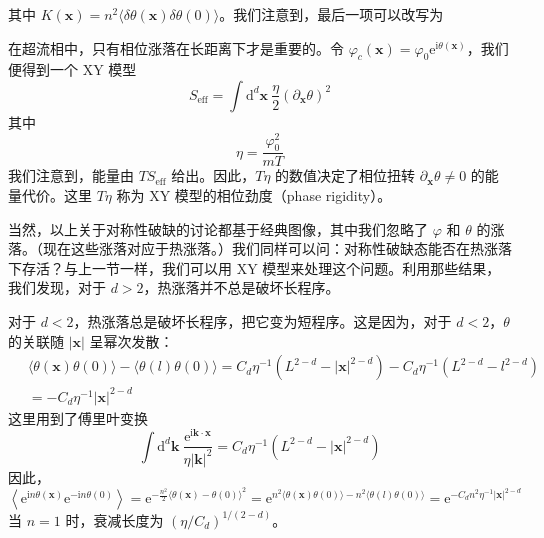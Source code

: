 其中 $K(\pmb{x}) = n^{2}\langle \delta\theta(\pmb{x})\delta\theta(0)\rangle$。我们注意到，最后一项可以改写为

在超流相中，只有相位涨落在长距离下才是重要的。令 $\varphi_c(\pmb{x}) = \varphi_0\mathrm{e}^{\mathrm{i}\theta(\pmb{x})}$，我们便得到一个 XY 模型
\begin{equation*}
S_{\mathrm{eff}} = \int \mathrm{d}^{d}\pmb{x}\ \frac{\eta}{2}(\partial_{\pmb{x}}\theta)^{2}
\tag{3.4.2}
\end{equation*}
其中
\begin{equation*}
\eta = \frac{\varphi_{0}^{2}}{mT}
\tag{3.4.3}
\end{equation*}
我们注意到，能量由 $TS_{\mathrm{eff}}$ 给出。因此，$T\eta$ 的数值决定了相位扭转 $\partial_{\pmb{x}}\theta \neq 0$ 的能量代价。这里 $T\eta$ 称为 XY 模型的相位劲度（phase rigidity）。

当然，以上关于对称性破缺的讨论都基于经典图像，其中我们忽略了 $\varphi$ 和 $\theta$ 的涨落。（现在这些涨落对应于热涨落。）我们同样可以问：对称性破缺态能否在热涨落下存活？与上一节一样，我们可以用 XY 模型来处理这个问题。利用那些结果，我们发现，对于 $d>2$，热涨落并不总是破坏长程序。

对于 $d<2$，热涨落总是破坏长程序，把它变为短程序。这是因为，对于 $d<2$，$\theta$ 的关联随 $|\pmb{x}|$ 呈幂次发散：
\begin{equation*}
\begin{aligned}
&\ \langle \theta(\pmb{x})\theta(0)\rangle - \langle \theta(l)\theta(0)\rangle
 = C_{d}\eta^{-1}(L^{2-d} - |\pmb{x}|^{2-d}) - C_{d}\eta^{-1}(L^{2-d} - l^{2-d}) \\
&\ = -C_{d}\eta^{-1}|\pmb{x}|^{2-d}
\end{aligned}
\end{equation*}
这里用到了傅里叶变换
\begin{equation*}
\int \mathrm{d}^{d}\pmb{k}\ \frac{\mathrm{e}^{\mathrm{i}\pmb{k}\cdot\pmb{x}}}{\eta|\pmb{k}|^{2}} = C_{d}\eta^{-1}(L^{2-d} - |\pmb{x}|^{2-d})
\end{equation*}
因此，
\begin{equation*}
\left\langle \mathrm{e}^{\mathrm{i}n\theta(\pmb{x})}\mathrm{e}^{-\mathrm{i}n\theta(0)} \right\rangle
= \mathrm{e}^{-\frac{n^{2}}{2}\langle \theta(\pmb{x})-\theta(0)\rangle^{2}}
= \mathrm{e}^{n^{2}\langle \theta(\pmb{x})\theta(0)\rangle - n^{2}\langle \theta(l)\theta(0)\rangle}
= \mathrm{e}^{-C_{d}n^{2}\eta^{-1}|\pmb{x}|^{2-d}}
\end{equation*}
当 $n=1$ 时，衰减长度为 $(\eta/C_{d})^{1/(2-d)}$。

